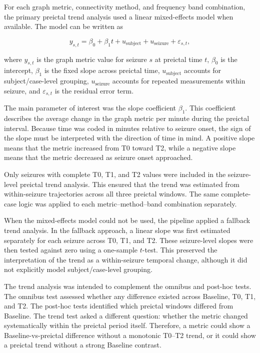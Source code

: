 For each graph metric, connectivity method, and frequency band combination, the
primary preictal trend analysis used a linear mixed-effects model when
available. The model can be written as

\[
    y_{s,t}
    =
    \beta_0
    +
    \beta_1 t
    +
    u_{\mathrm{subject}}
    +
    u_{\mathrm{seizure}}
    +
    \varepsilon_{s,t},
\]

where $y_{s,t}$ is the graph metric value for seizure $s$ at preictal time
$t$, $\beta_0$ is the intercept, $\beta_1$ is the fixed slope across preictal
time, $u_{\mathrm{subject}}$ accounts for subject/case-level grouping,
$u_{\mathrm{seizure}}$ accounts for repeated measurements within seizure, and
$\varepsilon_{s,t}$ is the residual error term.

The main parameter of interest was the slope coefficient $\beta_1$. This
coefficient describes the average change in the graph metric per minute during
the preictal interval. Because time was coded in minutes relative to seizure
onset, the sign of the slope must be interpreted with the direction of time in
mind. A positive slope means that the metric increased from T0 toward T2, while
a negative slope means that the metric decreased as seizure onset approached.

Only seizures with complete T0, T1, and T2 values were included in the
seizure-level preictal trend analysis. This ensured that the trend was
estimated from within-seizure trajectories across all three preictal windows.
The same complete-case logic was applied to each metric--method--band
combination separately.

When the mixed-effects model could not be used, the pipeline applied a fallback
trend analysis. In the fallback approach, a linear slope was first estimated
separately for each seizure across T0, T1, and T2. These seizure-level slopes
were then tested against zero using a one-sample $t$-test. This preserved the
interpretation of the trend as a within-seizure temporal change, although it
did not explicitly model subject/case-level grouping.

The trend analysis was intended to complement the omnibus and post-hoc tests.
The omnibus test assessed whether any difference existed across Baseline, T0,
T1, and T2. The post-hoc tests identified which preictal windows differed from
Baseline. The trend test asked a different question: whether the metric changed
systematically within the preictal period itself. Therefore, a metric could
show a Baseline-vs-preictal difference without a monotonic T0--T2 trend, or it
could show a preictal trend without a strong Baseline contrast.

